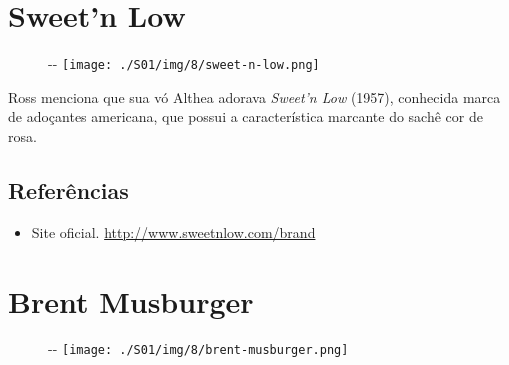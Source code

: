 \hypertarget{sweetn-low}{%
\section{Sweet'n Low}\label{sweetn-low}}

\begin{figure}[!ht]
  \begin{adjustwidth}{-\oddsidemargin-1in}{-\rightmargin}
    \centering
    \texttt{[image: ./S01/img/8/sweet-n-low.png]}
  \end{adjustwidth}
\end{figure}

Ross menciona que sua vó Althea adorava \emph{Sweet'n Low} (1957),
conhecida marca de adoçantes americana, que possui a característica
marcante do sachê cor de rosa.

\hypertarget{referuxeancias}{%
\subsection{Referências}\label{referuxeancias}}

\begin{itemize}
\tightlist
\item
  \sloppy Site oficial. \url{http://www.sweetnlow.com/brand}
\end{itemize}

\hypertarget{brent-musburger}{%
\section{Brent Musburger}\label{brent-musburger}}

\begin{figure}[!ht]
  \begin{adjustwidth}{-\oddsidemargin-1in}{-\rightmargin}
    \centering
    \texttt{[image: ./S01/img/8/brent-musburger.png]}
  \end{adjustwidth}
\end{figure}

